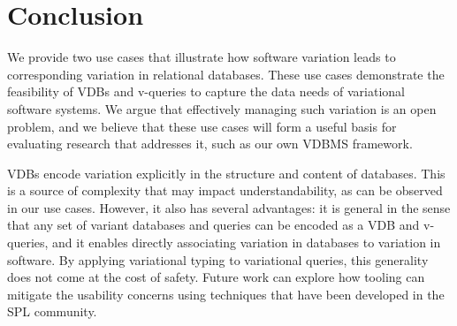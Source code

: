 \chapter{Conclusion}
\label{ch:conclusion}


We provide two use cases that illustrate how software variation leads to
corresponding variation in relational databases. These use cases demonstrate
the feasibility of VDBs and v-queries to capture the data needs of variational
software systems.
%
We argue that effectively managing such variation is an open problem, and we
believe that these use cases will form a useful basis for evaluating
research that addresses it, such as our own VDBMS framework.
%
%


VDBs encode variation explicitly in the structure and content of databases.
%
This is a source of complexity that may impact understandability, as can be
observed in our use cases. However, it also has several advantages: it
is general in the sense that any set of variant databases and queries can be
encoded as a VDB and v-queries, and it enables directly associating variation
in databases to variation in software.
%
By applying variational typing to variational queries, this generality does not
come at the cost of safety. Future work can explore how tooling can mitigate
the usability concerns using techniques that have been developed in the SPL
community.



